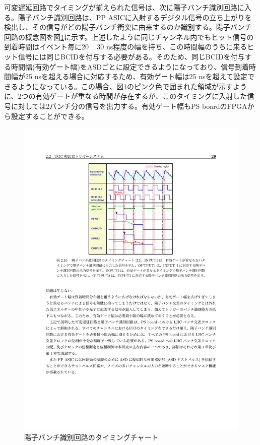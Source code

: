 可変遅延回路でタイミングが揃えられた信号は、次に陽子バンチ識別回路に入る。陽子バンチ識別回路は、PP ASICに入射するデジタル信号の立ち上がりを検出し、その信号がどの陽子バンチ衝突に由来するのか識別する。陽子バンチ回路の概念図を図\ref{TGC_BCID}に示す。上述したように同じチャンネル内でもヒット信号の到着時間はイベント毎に20 ~ 30 ns程度の幅を持ち、この時間幅のうちに来るヒット信号には同じBCIDを付与する必要がある。そのため、同じBCIDを付与する時間幅(有効ゲート幅)をASDごとに設定できるようになっており、信号到着時間幅が25 nsを超える場合に対応するため、有効ゲート幅は25 nsを超えて設定できるようになっている。この場合、図\ref{TGC_BCID}のピンク色で囲まれた領域が示すように、2つの有効ゲートが重なる時間が存在するが、このタイミングに入射した信号に対しては2バンチ分の信号を出力する。有効ゲート幅もPS boardのFPGAから設定することができる。

\begin{figure} 
\centering
\includegraphics[width=16cm]{fig/Intro/TGC_BCID.pdf}
\caption[陽子バンチ識別回路のタイミングチャート]{陽子バンチ識別回路のタイミングチャート\cite{mt_takemoto}}
\label{TGC_BCID}
\end{figure}

